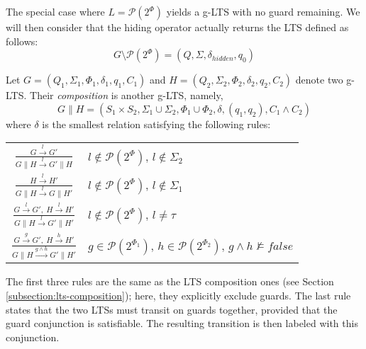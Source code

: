 The special case where $L = \mathcal{P}(2^\Phi)$ yields a g-LTS with no guard remaining. We will then consider that the hiding operator actually returns the LTS defined as follows:
\begin{equation*}
G \setminus \mathcal{P}(2^\Phi) = (Q,\Sigma,\delta_{hidden},q_0)
\end{equation*}

\begin{definition}
Let $G = (Q_1,\Sigma_1,\Phi_1,\delta_1,q_{1},C_{1})$ and $H = (Q_2,\Sigma_2,\Phi_2,\delta_2,q_{2},C_{2})$ denote two g-LTS. Their \emph{composition} is another g-LTS, namely,
\begin{equation*}
G \parallel H = (S_1 \times S_2,\Sigma_1\cup\Sigma_2,\Phi_1\cup\Phi_2,\delta,(q_1,q_2),C_1 \wedge C_2)
\end{equation*}
\noindent where $\delta$ is the smallest relation satisfying the following rules:

\centering
\begin{tabular}{cl}
$\frac{\displaystyle G \stackrel{l}{\longrightarrow} G'}{\displaystyle G \parallel H \stackrel{l}{\longrightarrow} G' \parallel H}$ & $l \notin \mathcal{P}(2^\Phi)$, $l \notin \Sigma_2$ \\[20pt]

$\frac{\displaystyle H \stackrel{l}{\longrightarrow} H'}{\displaystyle G \parallel H \stackrel{l}{\longrightarrow} G \parallel H'}$ & $l \notin \mathcal{P}(2^\Phi)$, $l \notin \Sigma_1$ \\[20pt]

$\frac{\displaystyle G \stackrel{l}{\longrightarrow} G',~H \stackrel{l}{\longrightarrow} H'}{\displaystyle G \parallel H \stackrel{l}{\longrightarrow} G' \parallel H'}$ & $l \notin \mathcal{P}(2^\Phi)$, $l \neq \tau$ \\[20pt]

$\frac{\displaystyle G \stackrel{g}{\longrightarrow} G',~H \stackrel{h}{\longrightarrow} H'}{\displaystyle G \parallel H \stackrel{g \wedge h}{\longrightarrow} G' \parallel H'}$ & $g \in \mathcal{P}(2^{\Phi_1})$, $h \in \mathcal{P}(2^{\Phi_2})$, $g \wedge h \nvDash false$ 
\end{tabular}
\end{definition}

The first three rules are the same as the LTS composition ones (see Section \ref{subsection:lts-composition}); here, they explicitly exclude guards. The last rule states that the two LTSs must transit on guards together, provided that the guard conjunction is satisfiable. The resulting transition is then labeled with this conjunction.
